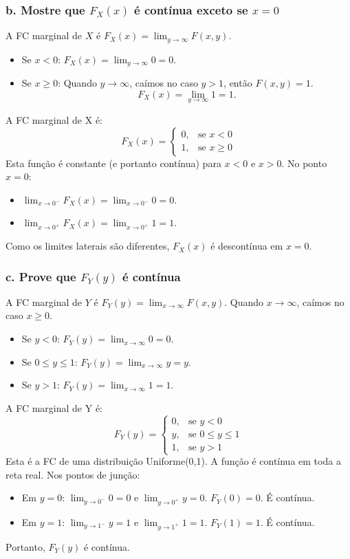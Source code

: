 \documentclass[12pt]{article}
\begin{document}
\subsubsection*{b. Mostre que $F_X(x)$ é contínua exceto se $x=0$}
A FC marginal de $X$ é $F_X(x) = \lim_{y\to\infty} F(x,y)$.
\begin{itemize}
    \item Se $x < 0$: $F_X(x) = \lim_{y\to\infty} 0 = 0$.
    \item Se $x \ge 0$: Quando $y\to\infty$, caímos no caso $y>1$, então $F(x,y)=1$.
    \[ F_X(x) = \lim_{y\to\infty} 1 = 1. \]
\end{itemize}
A FC marginal de X é:
\[ F_X(x) = \begin{cases} 0, & \text{se } x < 0 \\ 1, & \text{se } x \ge 0 \end{cases} \]
Esta função é constante (e portanto contínua) para $x < 0$ e $x > 0$. No ponto $x=0$:
\begin{itemize}
    \item $\lim_{x\to 0^-} F_X(x) = \lim_{x\to 0^-} 0 = 0$.
    \item $\lim_{x\to 0^+} F_X(x) = \lim_{x\to 0^+} 1 = 1$.
\end{itemize}
Como os limites laterais são diferentes, $F_X(x)$ é descontínua em $x=0$.

\subsubsection*{c. Prove que $F_Y(y)$ é contínua}
A FC marginal de $Y$ é $F_Y(y) = \lim_{x\to\infty} F(x,y)$.
Quando $x\to\infty$, caímos no caso $x \ge 0$.
\begin{itemize}
    \item Se $y < 0$: $F_Y(y) = \lim_{x\to\infty} 0 = 0$.
    \item Se $0 \le y \le 1$: $F_Y(y) = \lim_{x\to\infty} y = y$.
    \item Se $y > 1$: $F_Y(y) = \lim_{x\to\infty} 1 = 1$.
\end{itemize}
A FC marginal de Y é:
\[ F_Y(y) = \begin{cases} 0, & \text{se } y < 0 \\ y, & \text{se } 0 \le y \le 1 \\ 1, & \text{se } y > 1 \end{cases} \]
Esta é a FC de uma distribuição Uniforme(0,1). A função é contínua em toda a reta real. Nos pontos de junção:
\begin{itemize}
    \item Em $y=0$: $\lim_{y\to 0^-} 0 = 0$ e $\lim_{y\to 0^+} y = 0$. $F_Y(0)=0$. É contínua.
    \item Em $y=1$: $\lim_{y\to 1^-} y = 1$ e $\lim_{y\to 1^+} 1 = 1$. $F_Y(1)=1$. É contínua.
\end{itemize}
Portanto, $F_Y(y)$ é contínua.
\end{document}
